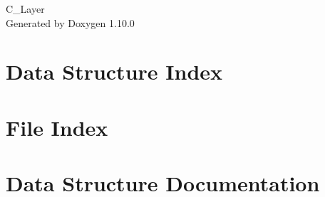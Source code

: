 \documentclass[twoside]{book}
\newcommand{\+}{\discretionary{\mbox{\scriptsize$\hookleftarrow$}}{}{}}
\newcommand{\clearemptydoublepage}{%
    \newpage{\pagestyle{empty}\cleardoublepage}%
  }
\begin{document}
  \raggedbottom
    \hypersetup{pageanchor=false,
                bookmarksnumbered=true,
                pdfencoding=unicode
               }
  \begin{titlepage}
  \vspace*{7cm}
  \begin{center}%
  {\Large C\+\_\+\+Layer}\\
  \vspace*{1cm}
  {\large Generated by Doxygen 1.10.0}\\
  \end{center}
  \end{titlepage}
  \clearemptydoublepage
  \tableofcontents
  \clearemptydoublepage
  \hypersetup{pageanchor=true}
\chapter{Data Structure Index}

\chapter{File Index}

\chapter{Data Structure Documentation}
























\end{document}
